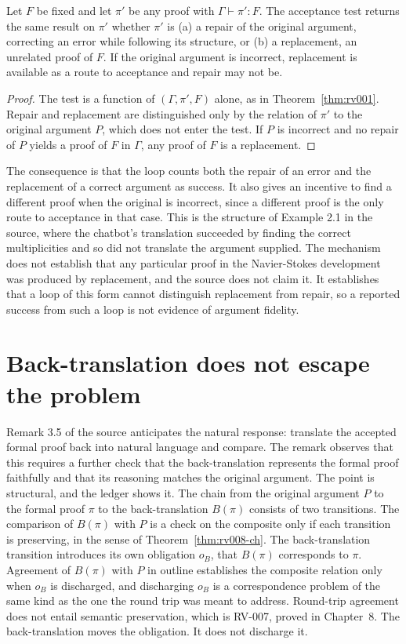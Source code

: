 \begin{proposition}
\label{prop:loop}
Let $F$ be fixed and let $\pi'$ be any proof with $\Gamma \vdash \pi' : F$. The acceptance test returns the same result on $\pi'$ whether $\pi'$ is (a) a repair of the original argument, correcting an error while following its structure, or (b) a replacement, an unrelated proof of $F$. If the original argument is incorrect, replacement is available as a route to acceptance and repair may not be.
\end{proposition}

\begin{proof}
The test is a function of $(\Gamma, \pi', F)$ alone, as in Theorem~\ref{thm:rv001}. Repair and replacement are distinguished only by the relation of $\pi'$ to the original argument $P$, which does not enter the test. If $P$ is incorrect and no repair of $P$ yields a proof of $F$ in $\Gamma$, any proof of $F$ is a replacement.
\end{proof}

The consequence is that the loop counts both the repair of an error and the replacement of a correct argument as success. It also gives an incentive to find a different proof when the original is incorrect, since a different proof is the only route to acceptance in that case. This is the structure of Example 2.1 in the source, where the chatbot's translation succeeded by finding the correct multiplicities and so did not translate the argument supplied. The mechanism does not establish that any particular proof in the Navier-Stokes development was produced by replacement, and the source does not claim it. It establishes that a loop of this form cannot distinguish replacement from repair, so a reported success from such a loop is not evidence of argument fidelity.

\section{Back-translation does not escape the problem}

Remark 3.5 of the source anticipates the natural response: translate the accepted formal proof back into natural language and compare. The remark observes that this requires a further check that the back-translation represents the formal proof faithfully and that its reasoning matches the original argument. The point is structural, and the ledger shows it. The chain from the original argument $P$ to the formal proof $\pi$ to the back-translation $B(\pi)$ consists of two transitions. The comparison of $B(\pi)$ with $P$ is a check on the composite only if each transition is preserving, in the sense of Theorem~\ref{thm:rv008-ch}. The back-translation transition introduces its own obligation $o_B$, that $B(\pi)$ corresponds to $\pi$. Agreement of $B(\pi)$ with $P$ in outline establishes the composite relation only when $o_B$ is discharged, and discharging $o_B$ is a correspondence problem of the same kind as the one the round trip was meant to address. Round-trip agreement does not entail semantic preservation, which is RV-007, proved in Chapter~8. The back-translation moves the obligation. It does not discharge it.

